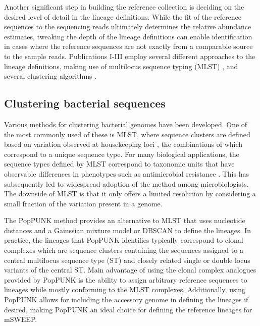 \documentclass[officiallayout]{tktla}
\begin{document}
Another significant step in building the reference collection is
deciding on the desired level of detail in the lineage
definitions. While the fit of the reference sequences to the
sequencing reads ultimately determines the relative abundance
estimates, tweaking the depth of the lineage definitions can enable identification in cases where the reference
sequences are not exactly from a comparable source to the sample
reads. Publications I-III employ several different approaches to the
lineage definitions, making use of multilocus sequence typing (MLST)
\citep{enright1999multilocus}, and several clustering algorithms
\citep{lees2019fast, cheng2013hierarchical, corander2006bayesian}.

\subsection{Clustering bacterial sequences}

Various methods for clustering bacterial genomes have been
developed. One of the most commonly used of these is MLST, where
sequence clusters are defined based on variation observed at
housekeeping loci \citep{enright1999multilocus}, the combinations of
which correspond to a unique sequence type. For many biological
applications, the sequence types defined by MLST correspond to
taxonomic units that have observable differences in phenotypes such as
antimicrobial resistance \citep{kallonen2017systematic,
  shaik2017comparative}. This has subsequently led to widespread
adoption of the method among microbiologists. The
downside of MLST is that it only offers a limited resolution by
considering a small fraction of the variation present in a genome.

The PopPUNK method \citep{lees2019fast} provides an alternative to
MLST that uses nucleotide distances and a Gaiussian
mixture model or DBSCAN \citep{ester1996density} to define the
lineages. In practice, the lineages that PopPUNK identifies typically
correspond to clonal complexes \citep{lees2019fast} which are sequence
clusters containing the sequences assigned to a central multilocus
sequence type (ST) and closely related single or double locus variants
of the central ST. Main advantage of using the clonal complex
analogues provided by PopPUNK is the ability to assign arbitrary
reference sequences to lineages while mostly conforming to the MLST
complexes. Additionally, using PopPUNK allows for including the
accessory genome in defining the lineages if desired, making PopPUNK
an ideal choice for defining the reference lineages for mSWEEP.
\end{document}

